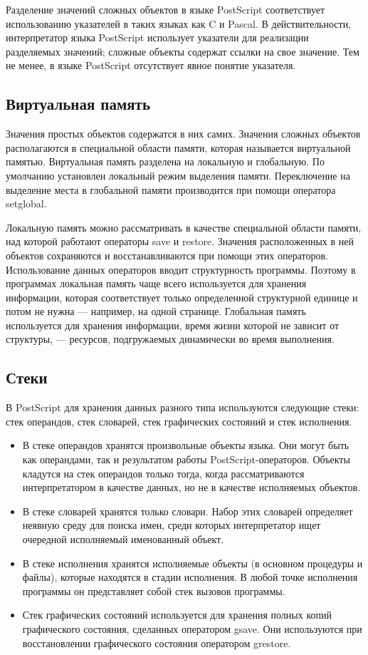 Разделение значений сложных объектов в языке PostScript соответствует использованию указателей в таких языках как C и Pascal. В действительности, интерпретатор языка PostScript использует указатели для реализации разделяемых значений; сложные объекты содержат ссылки на свое значение. Тем не менее, в языке PostScript отсутствует явное понятие указателя.


\subsection{Виртуальная память}

Значения простых объектов содержатся в них самих. Значения сложных объектов располагаются в специальной области памяти, которая называется виртуальной памятью. Виртуальная память разделена на локальную и глобальную. По умолчанию установлен локальный режим выделения памяти. Переключение на выделение места в глобальной памяти производится при помощи оператора setglobal.

Локальную память можно рассматривать в качестве специальной области памяти, над которой работают операторы save и restore. Значения расположенных в ней объектов сохраняются и восстанавливаются при помощи этих операторов. Использование данных операторов вводит структурность программы. Поэтому в программах локальная память чаще всего используется для хранения информации, которая соответствует только определенной структурной единице и потом не нужна --- например, на одной странице.  Глобальная память используется для хранения информации, время жизни которой не зависит от структуры, --- ресурсов, подгружаемых динамически во время выполнения.


\subsection{Стеки}

В PostScript для хранения данных разного типа используются следующие стеки: стек операндов, стек словарей, стек графических состояний и стек исполнения. 
\begin{itemize}
\item В стеке операндов хранятся произвольные объекты языка. Они могут быть как операндами, так и результатом работы PostScript-операторов. Объекты кладутся на стек операндов только тогда, когда рассматриваются интерпретатором в качестве данных, но не в качестве исполняемых объектов.
\item 	В стеке словарей хранятся только словари. Набор этих словарей определяет неявную среду для поиска имен, среди которых интерпретатор ищет очередной исполняемый именованный объект.
\item 	В стеке исполнения хранятся исполняемые объекты (в основном процедуры и файлы), которые находятся в стадии исполнения. В любой точке исполнения программы он представляет собой стек вызовов программы.
\item 	Стек графических состояний используется для хранения полных копий графического состояния, сделанных оператором gsave. Они используются при восстановлении графического состояния оператором grestore.
\end{itemize}


